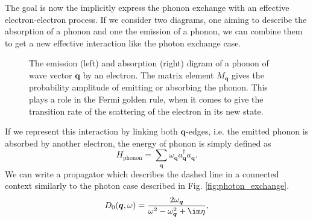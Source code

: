 \documentclass[../main.tex]{subfile}
\begin{document}
The goal is now the implicitly express the phonon exchange with an effective electron-electron process. If we consider two diagrams, one aiming to describe the absorption of a phonon
and one the emission of a phonon, we can combine them to get a new effective interaction like the photon exchange case.
\begin{figure}[H]
    \centering
     \hspace{2cm}
    \caption{The emission (left) and absorption (right) digram of a phonon of wave vector $\bm{q}$ by an electron.
    The matrix element $M_{\bm{q}}$ gives the probability amplitude of emitting or absorbing the phonon. This plays a role
    in the Fermi golden rule, when it comes to give the transition rate of the scattering of the electron in its new state.}
    \end{figure}
If we represent this interaction by linking both $\bm{q}$-edges, i.e. the emitted phonon is absorbed by another electron, the energy of phonon is simply defined as
\[
    H_{\text{phonon}} = \sum_{\bm{q}} \omega_{\bm{q}} a_{\bm{q}}^{\dagger}a_{\bm{q}}.
\]
We can write a propagator which describes the dashed line in a connected context similarly to the photon case described in Fig. \ref{fig:photon_exchange}.
\[
    D_0(\bm{q},\omega) = \frac{2\omega_{\bm{q}}}{\omega^2 - \omega_{\bm{q}}^2 + \im \eta},
\]
\end{document}
